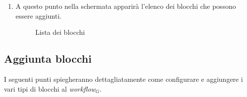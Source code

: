 \begin{enumerate}
\newpage
\item A questo punto nella schermata apparirà l'elenco dei blocchi che possono essere aggiunti.
\begin{figure}[!ht]
	\centering
	\caption{Lista dei blocchi}
\end{figure}
\end{enumerate}

\newpage
\subsection{Aggiunta blocchi}
I seguenti punti spiegheranno dettagliatamente come configurare e aggiungere i vari tipi di blocchi al \textit{workflow$_{G}$}.\\

